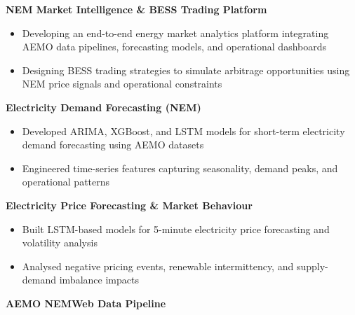 \documentclass[10pt,a4paper]{article}
\begin{document}
\begin{tcolorbox}[
colback=SoftBg,
colframe=SoftLine,
arc=3pt,
boxrule=0.5pt,
left=10pt,
right=10pt,
top=8pt,
bottom=8pt
]

\textbf{\color{Secondary} NEM Market Intelligence \& BESS Trading Platform}

\vspace{2pt}

\begin{itemize}
\item Developing an end-to-end energy market analytics platform integrating AEMO data pipelines, forecasting models, and operational dashboards
\item Designing BESS trading strategies to simulate arbitrage opportunities using NEM price signals and operational constraints
\end{itemize}

\vspace{5pt}

\textbf{\color{Secondary} Electricity Demand Forecasting (NEM)}

\vspace{2pt}

\begin{itemize}
\item Developed ARIMA, XGBoost, and LSTM models for short-term electricity demand forecasting using AEMO datasets
\item Engineered time-series features capturing seasonality, demand peaks, and operational patterns
\end{itemize}

\vspace{5pt}

\textbf{\color{Secondary} Electricity Price Forecasting \& Market Behaviour}

\vspace{2pt}

\begin{itemize}
\item Built LSTM-based models for 5-minute electricity price forecasting and volatility analysis
\item Analysed negative pricing events, renewable intermittency, and supply-demand imbalance impacts
\end{itemize}

\vspace{5pt}

\textbf{\color{Secondary} AEMO NEMWeb Data Pipeline}

\vspace{2pt}


\end{tcolorbox}
\end{document}
